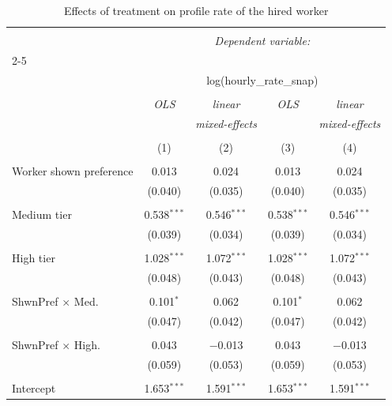 
\begin{table}[!htbp] \centering 
  \caption{Effects of treatment on profile rate of the hired worker} 
  \label{tab:pr_hired} 
\begin{tabular}{@{\extracolsep{5pt}}lcccc} 
\\[-1.8ex]\hline 
\hline \\[-1.8ex] 
 & \multicolumn{4}{c}{\textit{Dependent variable:}} \\ 
\cline{2-5} 
\\[-1.8ex] & \multicolumn{4}{c}{log(hourly\_rate\_snap)} \\ 
\\[-1.8ex] & \textit{OLS} & \textit{linear} & \textit{OLS} & \textit{linear} \\ 
 & \textit{} & \textit{mixed-effects} & \textit{} & \textit{mixed-effects} \\ 
\\[-1.8ex] & (1) & (2) & (3) & (4)\\ 
\hline \\[-1.8ex] 
 Worker shown preference & 0.013 & 0.024 & 0.013 & 0.024 \\ 
  & (0.040) & (0.035) & (0.040) & (0.035) \\ 
  & & & & \\ 
 Medium tier & 0.538$^{***}$ & 0.546$^{***}$ & 0.538$^{***}$ & 0.546$^{***}$ \\ 
  & (0.039) & (0.034) & (0.039) & (0.034) \\ 
  & & & & \\ 
 High tier & 1.028$^{***}$ & 1.072$^{***}$ & 1.028$^{***}$ & 1.072$^{***}$ \\ 
  & (0.048) & (0.043) & (0.048) & (0.043) \\ 
  & & & & \\ 
 ShwnPref $\times$ Med. & 0.101$^{*}$ & 0.062 & 0.101$^{*}$ & 0.062 \\ 
  & (0.047) & (0.042) & (0.047) & (0.042) \\ 
  & & & & \\ 
 ShwnPref $\times$ High. & 0.043 & $-$0.013 & 0.043 & $-$0.013 \\ 
  & (0.059) & (0.053) & (0.059) & (0.053) \\ 
  & & & & \\ 
 Intercept & 1.653$^{***}$ & 1.591$^{***}$ & 1.653$^{***}$ & 1.591$^{***}$ \\ 

\end{tabular}
\end{table}
